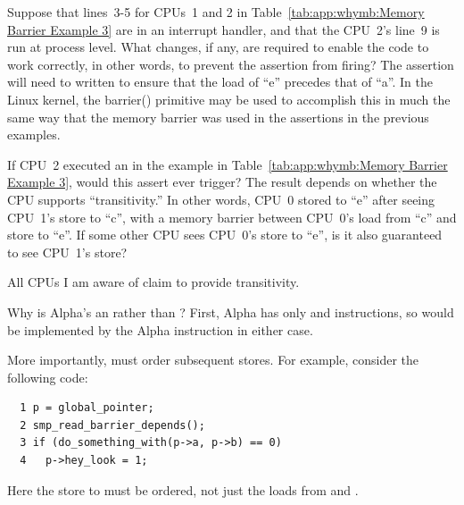 \QuickQ{}
	Suppose that lines~3-5 for CPUs~1 and 2 in
	Table~\ref{tab:app:whymb:Memory Barrier Example 3}
	are in an interrupt
	handler, and that the CPU~2's line~9 is run at process level.
	What changes, if any, are required to enable the code to work
	correctly, in other words, to prevent the assertion from firing?
\QuickA{}
	The assertion will need to written to ensure that the load of
	``e'' precedes that of ``a''.
	In the Linux kernel, the barrier() primitive may be used to accomplish
	this in much the same way that the memory barrier was used in the
	assertions in the previous examples.

\QuickQ{}
	If CPU~2 executed an  in the example in
	Table~\ref{tab:app:whymb:Memory Barrier Example 3},
	would this assert ever trigger?
\QuickA{}
	The result depends on whether the CPU supports ``transitivity.''
	In other words, CPU~0 stored to ``e'' after seeing CPU~1's
	store to ``c'', with a memory barrier between CPU~0's load
	from ``c'' and store to ``e''.
	If some other CPU sees CPU~0's store to ``e'', is it also
	guaranteed to see CPU~1's store?

	All CPUs I am aware of claim to provide transitivity.

\QuickQ{}
	Why is Alpha's  an
	 rather than ?
\QuickA{}
	First, Alpha has only  and  instructions,
	so  would be implemented by the Alpha 
	instruction in either case.

	More importantly,  must
	order subsequent stores.
	For example, consider the following code:

\vspace{5pt}
\begin{minipage}[t]{\columnwidth}
\small
\begin{verbatim}
  1 p = global_pointer;
  2 smp_read_barrier_depends();
  3 if (do_something_with(p->a, p->b) == 0)
  4   p->hey_look = 1;
\end{verbatim}
\end{minipage}
\vspace{5pt}

	Here the store to  must be ordered,
	not just the loads from  and .

